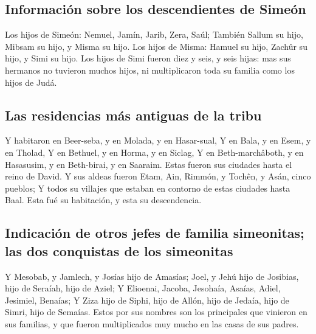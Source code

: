 \hypertarget{informaciuxf3n-sobre-los-descendientes-de-simeuxf3n}{%
\subsection{Información sobre los descendientes de
Simeón}\label{informaciuxf3n-sobre-los-descendientes-de-simeuxf3n}}

 Los hijos de Simeón: Nemuel, Jamín, Jarib, Zera, Saúl;
 También Sallum su hijo, Mibsam su hijo, y Misma su hijo.
 Los hijos de Misma: Hamuel su hijo, Zachûr su hijo, y Simi
su hijo.  Los hijos de Simi fueron diez y seis, y seis
hijas: mas sus hermanos no tuvieron muchos hijos, ni multiplicaron toda
su familia como los hijos de Judá.

\hypertarget{las-residencias-muxe1s-antiguas-de-la-tribu}{%
\subsection{Las residencias más antiguas de la
tribu}\label{las-residencias-muxe1s-antiguas-de-la-tribu}}

 Y habitaron en Beer-seba, y en Molada, y en Hasar-sual,
 Y en Bala, y en Esem, y en Tholad,  Y en
Bethuel, y en Horma, y en Siclag,  Y en Beth-marchâboth, y
en Hasasusim, y en Beth-birai, y en Saaraim. Estas fueron sus ciudades
hasta el reino de David.  Y sus aldeas fueron Etam, Ain,
Rimmón, y Tochên, y Asán, cinco pueblos;  Y todos su
villajes que estaban en contorno de estas ciudades hasta Baal. Esta fué
su habitación, y esta su descendencia.

\hypertarget{indicaciuxf3n-de-otros-jefes-de-familia-simeonitas-las-dos-conquistas-de-los-simeonitas}{%
\subsection{Indicación de otros jefes de familia simeonitas; las dos
conquistas de los
simeonitas}\label{indicaciuxf3n-de-otros-jefes-de-familia-simeonitas-las-dos-conquistas-de-los-simeonitas}}

 Y Mesobab, y Jamlech, y Josías hijo de Amasías;
 Joel, y Jehú hijo de Josibias, hijo de Seraíah, hijo de
Aziel;  Y Elioenai, Jacoba, Jesohaía, Asaías, Adiel,
Jesimiel, Benaías;  Y Ziza hijo de Siphi, hijo de Allón,
hijo de Jedaía, hijo de Simri, hijo de Semaías.  Estos por
sus nombres son los principales que vinieron en sus familias, y que
fueron multiplicados muy mucho en las casas de sus padres.


